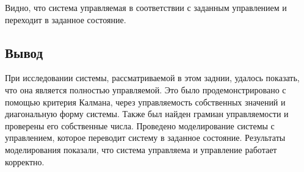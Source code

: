 Видно, что система управляемая в соответствии с заданным управлением и переходит в заданное состояние. 
\FloatBarrier
\subsection{Вывод}
При исследовании системы, рассматриваемой в этом заднии, удалось показать, что она является 
полностью управляемой. Это было продемонстрировано с помощью критерия Калмана, через 
управляемость собственных значений и диагональную форму системы. Также был найден грамиан 
управляемости и проверены его собственные числа. Проведено моделирование системы с управлением, 
которое переводит систему в заданное состояние. Результаты моделирования показали, что система
управляема и управление работает корректно. 